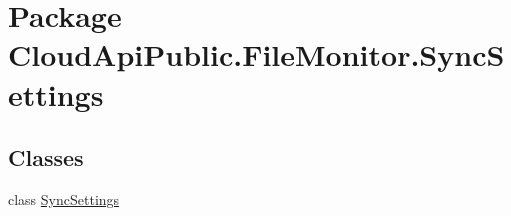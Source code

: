 \hypertarget{namespace_cloud_api_public_1_1_file_monitor_1_1_sync_settings}{\section{Package Cloud\-Api\-Public.\-File\-Monitor.\-Sync\-Settings}
\label{namespace_cloud_api_public_1_1_file_monitor_1_1_sync_settings}
}
\subsection*{Classes}
\begin{DoxyCompactItemize}
\item 
class \hyperlink{class_cloud_api_public_1_1_file_monitor_1_1_sync_settings_1_1_sync_settings}{Sync\-Settings}
\end{DoxyCompactItemize}
